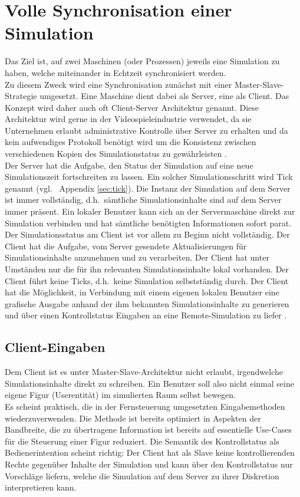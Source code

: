\section{Volle Synchronisation einer Simulation}
Das Ziel ist, auf zwei Maschinen (oder Prozessen) jeweils eine Simulation zu haben, welche miteinander in Echtzeit synchronisiert werden.\\
Zu diesem Zweck wird eine Synchronisation zunächst mit einer Master-Slave-Strategie umgesetzt. Eine Maschine dient dabei als Server, eine als Client. Das Konzept wird daher auch oft Client-Server Architektur genannt.
Diese Architektur wird gerne in der Videospieleindustrie verwendet, da sie Unternehmen erlaubt administrative Kontrolle über Server zu erhalten und da kein aufwendiges  Protokoll benötigt wird um die Konsistenz zwischen verschiedenen Kopien des Simulationstatus zu gewährleisten \cite{Cronin01adistributed}.\\
Der Server hat die Aufgabe, den Status der Simulation auf eine neue Simulationszeit fortschreiten zu lassen. Ein solcher Simulationsschritt wird Tick genannt (vgl.~ Appendix \ref{sec:tick}). Die Instanz der Simulation auf dem Server ist immer vollständig, d.h.~sämtliche Simulationsinhalte sind auf dem Server immer präsent. Ein lokaler Benutzer kann sich an der Servermaschine direkt zur Simulation verbinden und hat sämtliche benötigten Informationen sofort parat.\\
Der Simulationsstatus am Client ist vor allem zu Beginn nicht vollständig. Der Client hat die Aufgabe, vom Server gesendete Aktualisierungen für Simulationsinhalte anzunehmen und zu verarbeiten. Der Client hat unter Umständen nur die für ihn relevanten Simulationsinhalte lokal vorhanden. Der Client führt keine Ticks, d.h.~keine Simulation selbstständig durch. Der Client hat die Möglichkeit, in Verbindung mit einem eigenen lokalen Benutzer eine grafische Ausgabe anhand der ihm bekannten Simulationsinhalte zu generieren und über einen Kontrollstatus Eingaben an eine Remote-Simulation zu liefer \cite[ch. 6.1]{gamenetworking00}. 

\subsection{Client-Eingaben}
Dem Client ist es unter Master-Slave-Architektur nicht erlaubt, irgendwelche Simulationsinhalte direkt zu schreiben. Ein Benutzer soll also nicht einmal seine eigene Figur (Userentität) im simulierten Raum selbst bewegen.\\
Es scheint praktisch, die in der Fernsteuerung umgesetzten Eingabemethoden wiederzuverwenden. Die Methode ist bereits optimiert in Aspekten der Bandbreite, die zu übertragene Information ist bereits auf essentielle Use-Cases für die Steuerung einer Figur reduziert. Die Semantik des Kontrollstatus als Bedienerintention scheint richtig: Der Client hat als Slave keine kontrollierenden Rechte gegenüber Inhalte der Simulation und kann über den Kontrollstatus nur Vorschläge liefern, welche die Simulation auf dem Server zu ihrer Diskretion interpretieren kann.

